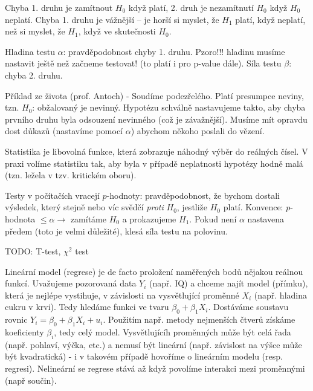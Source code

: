 \documentclass[a4paper,10pt,titlepage]{article} \usepackage[utf8]{inputenc}
\begin{document}
Chyba 1. druhu je zamítnout $H_0$ když platí, 2. druh je nezamítnutí $H_0$
když $H_0$ neplatí. Chyba 1. druhu je vážnější -- je horší si myslet,
že $H_1$ platí, když neplatí, než si myslet, že $H_1$, když ve skutečnosti
$H_0$.

Hladina testu $\alpha$: pravděpodobnost chyby 1. druhu. Pzoro!!! hladinu
musíme nastavit ještě než začneme testovat! (to platí i pro p-value dále).
Síla testu $\beta$: chyba 2. druhu.

Příklad ze života (prof. Antoch) - Soudíme podezřelého. Platí presumpce neviny,
tzn. $H_0$: obžalovaný je nevinný. Hypotézu schválně nastavujeme takto, aby 
chyba prvního druhu byla odsouzení nevinného (což je závažnější). Musíme mít
opravdu dost důkazů (nastavíme pomocí $\alpha$) abychom někoho poslali do vězení.

Statistika je libovolná funkce, která zobrazuje náhodný výběr do reálných čísel.
V praxi volíme statistiku tak, aby byla v případě neplatnosti hypotézy hodně malá
(tzn. ležela v tzv. kritickém oboru).

Testy v počítačích vracejí $p$-hodnoty: pravděpodobnost, že bychom dostali
výsledek, který stejně nebo víc svědčí \emph{proti} $H_0$, jestliže $H_0$ platí.
Konvence: $p$-hodnota $\leq\alpha\longrightarrow$ zamítáme $H_0$ a prokazujeme
$H_1$. Pokud není $\alpha$ nastavena předem (toto je velmi důležité), klesá
síla testu na polovinu.

TODO: T-test, $\chi^2$ test

Lineární model (regrese) je de facto proložení naměřených bodů nějakou reálnou funkcí.
Uvažujeme pozorovaná data $Y_i$ (např. IQ) a chceme najít model (přímku), která je
nejlépe vystihuje, v závislosti na vysvětlující proměnné $X_i$ (např. hladina cukru v
krvi). Tedy hledáme funkci ve tvaru $\beta_0 + \beta_1X_i$. Dostáváme soustavu rovnic
$Y_i = \beta_0 + \beta_1X_i + u_i$. Použitím např. metody nejmenších čtverů získáme 
koeficienty $\beta_i$, tedy celý model. Vysvětlujícíh proměnných může být celá řada
(např. pohlaví, výčka, etc.) a nemusí být lineární (např. závislost na výšce může
být kvadratická) - i v takovém případě hovoříme o lineárním modelu (resp. regresi).
Nelineární se regrese stává až když povolíme interakci mezi proměnnými (např součin).
\end{document}
